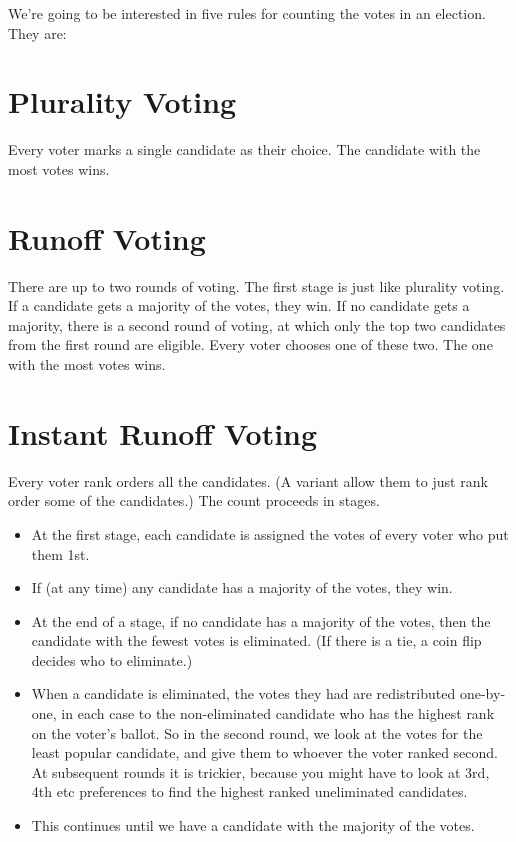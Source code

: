 
\def\mytitle{Voting Systems}
\def\myauthor{Brian Weatherson}
\def\mydate{February 22, 2018}


\noindent We're going to be interested in five rules for counting the votes in an election. They are:

\section{Plurality Voting}
\label{pluralityvoting}

Every voter marks a single candidate as their choice. The candidate with the most votes wins.

\section{Runoff Voting}
\label{runoffvoting}

There are up to two rounds of voting. The first stage is just like plurality voting. If a candidate gets a majority of the votes, they win. If no candidate gets a majority, there is a second round of voting, at which only the top two candidates from the first round are eligible. Every voter chooses one of these two. The one with the most votes wins.

\section{Instant Runoff Voting}
\label{instantrunoffvoting}

Every voter rank orders all the candidates. (A variant allow them to just rank order some of the candidates.) The count proceeds in stages.

\begin{itemize}
\item{} At the first stage, each candidate is assigned the votes of every voter who put them 1st.

\item{} If (at any time) any candidate has a majority of the votes, they win.

\item{} At the end of a stage, if no candidate has a majority of the votes, then the candidate with the fewest votes is eliminated. (If there is a tie, a coin flip decides who to eliminate.)

\item{} When a candidate is eliminated, the votes they had are redistributed one-by-one, in each case to the non-eliminated candidate who has the highest rank on the voter's ballot. So in the second round, we look at the votes for the least popular candidate, and give them to whoever the voter ranked second. At subsequent rounds it is trickier, because you might have to look at 3rd, 4th etc preferences to find the highest ranked uneliminated candidates.

\item{} This continues until we have a candidate with the majority of the votes.

\end{itemize}

